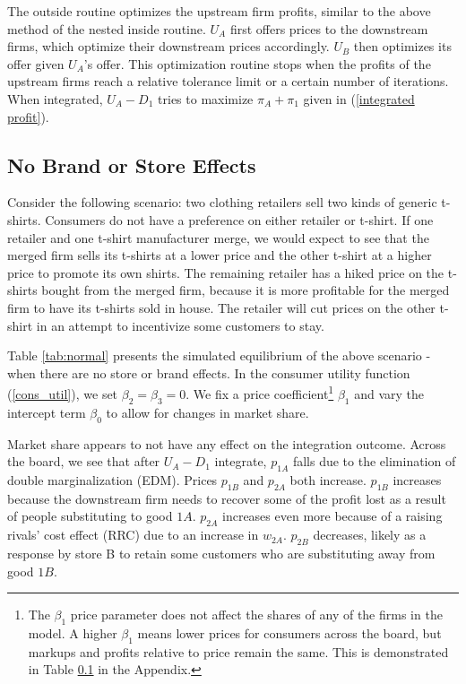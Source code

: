 \documentclass[12pt]{article}%
\begin{document}
The outside routine optimizes the upstream firm profits, similar to the above method of the nested inside routine. $U_A$ first offers prices to the downstream firms, which optimize their downstream prices accordingly. $U_B$ then optimizes its offer given $U_A$'s offer. This optimization routine stops when the profits of the upstream firms reach a relative tolerance limit or a certain number of iterations. When integrated, $U_A-D_1$ tries to maximize $\pi_A + \pi_1$ given in (\ref{integrated profit}).

\subsection{No Brand or Store Effects}
Consider the following scenario: two clothing retailers sell two kinds of generic t-shirts. Consumers do not have a preference on either retailer or t-shirt. If one retailer and one t-shirt manufacturer merge, we would expect to see that the merged firm sells its t-shirts at a lower price and the other t-shirt at a higher price to promote its own shirts. The remaining retailer has a hiked price on the t-shirts bought from the merged firm, because it is more profitable for the merged firm to have its t-shirts sold in house. The retailer will cut prices on the other t-shirt in an attempt to incentivize some customers to stay.

Table \ref{tab:normal} presents the simulated equilibrium of the above scenario - when there are no store or brand effects. In the consumer utility function (\ref{cons_util}), we set $\beta_2 = \beta_3 = 0$. We fix a price coefficient\footnote{The $\beta_1$ price parameter does not affect the shares of any of the firms in the model. A higher $\beta_1$ means lower prices for consumers across the board, but markups and profits relative to price remain the same. This is demonstrated in Table \ref{} in the Appendix.} $\beta_1$ and vary the intercept term $\beta_0$ to allow for changes in market share. 

Market share appears to not have any effect on the integration outcome. Across the board, we see that after $U_A-D_1$ integrate, $p_{1A}$ falls due to the elimination of double marginalization (EDM). Prices $p_{1B}$ and $p_{2A}$ both increase. $p_{1B}$ increases because the downstream firm needs to recover some of the profit lost as a result of people substituting to good $1A$. $p_{2A}$ increases even more because of a raising rivals' cost effect (RRC) due to an increase in $w_{2A}$. $p_{2B}$ decreases, likely as a response by store B to retain some customers who are substituting away from good $1B$. 
\end{document}
